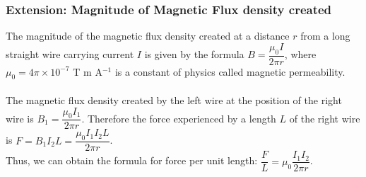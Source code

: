 \documentclass[a4paper,12pt]{article}
\begin{document}
\subsubsection*{Extension: Magnitude of Magnetic Flux density created}
 The magnitude of the magnetic flux density created at a distance $r$ from a long straight
wire carrying current $I$ is given by the formula $B=\dfrac{\mu_0I}{2\pi r}$, where $\mu_0=4\pi\times 10^{-7}$ T m A$^{-1}$ is a constant of
physics called magnetic permeability. \\\\
The magnetic flux density
created by the left wire at the position of the right wire is $B_1=\dfrac{\mu_0I_1}{2\pi r}$. 
Therefore the force experienced by a length $L$ of the right wire is $F=B_1I_2L=\dfrac{\mu_0I_1I_2L}{2\pi r}$.\\
Thus, we can obtain the formula for force per unit length: $\dfrac{F}{L}=\mu_0\dfrac{I_1I_2}{2\pi r}$.
\end{document}
